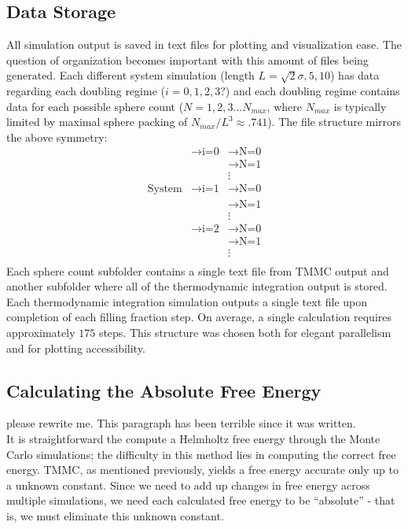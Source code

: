 \documentclass[12pt]{article}
\begin{document}
\subsection{Data Storage}
All simulation output is saved in text files for plotting and visualization ease. The question of organization becomes important with this amount of files being generated. Each different system simulation (length $L = \sqrt2 \sigma, 5,10$) has data regarding each doubling regime ($i=0,1,2,3?$) and each doubling regime contains data for each possible sphere count ($N=1,2,3\dots N_{max}$, where $N_{max}$ is typically limited by maximal sphere packing of $N_{max}/L^3\approx.741$). The file structure mirrors the above symmetry: 
\begin{align*}
                &\rightarrow \text{i=0} &\rightarrow \text{N=0}\\
                & &\rightarrow \text{N=1}\\
                && \vdots\\
\text{System} & \rightarrow \text{i=1} &\rightarrow \text{N=0}\\
                && \rightarrow \text{N=1}\\
                &&\vdots\\
                &\rightarrow \text{i=2} &\rightarrow \text{N=0}\\
                && \rightarrow \text{N=1}\\
                &&\vdots\\
\end{align*}
Each sphere count subfolder contains a single text file from TMMC output and another subfolder where all of the thermodynamic integration output is stored. Each thermodynamic integration simulation outputs a single text file upon completion of each filling fraction step. On average, a single calculation requires approximately $175$ steps. This structure was chosen both for elegant parallelism and for plotting accessibility. 

\subsection{Calculating the Absolute Free Energy}
{\color{red} please rewrite me. This paragraph has been terrible since it was written.}\\
It is straightforward the compute a Helmholtz free energy through the Monte Carlo simulations; the difficulty in this method lies in computing the correct free energy. TMMC, as mentioned previously, yields a free energy accurate only up to a unknown constant. Since we need to add up changes in free energy across multiple simulations, we need each calculated free energy to be ``absolute'' - that is, we must eliminate this unknown constant. \\
\end{document}
